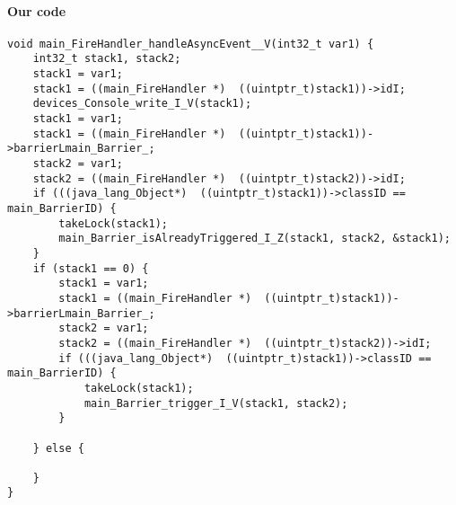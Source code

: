 \paragraph{Our code}\hfill
\begin{lstlisting}[firstnumber=2759]
void main_FireHandler_handleAsyncEvent__V(int32_t var1) {
	int32_t stack1, stack2;
	stack1 = var1;
	stack1 = ((main_FireHandler *)  ((uintptr_t)stack1))->idI;
	devices_Console_write_I_V(stack1);
	stack1 = var1;
	stack1 = ((main_FireHandler *)  ((uintptr_t)stack1))->barrierLmain_Barrier_;
	stack2 = var1;
	stack2 = ((main_FireHandler *)  ((uintptr_t)stack2))->idI;
	if (((java_lang_Object*)  ((uintptr_t)stack1))->classID == main_BarrierID) {
		takeLock(stack1);
		main_Barrier_isAlreadyTriggered_I_Z(stack1, stack2, &stack1);
	}
	if (stack1 == 0) {
		stack1 = var1;
		stack1 = ((main_FireHandler *)  ((uintptr_t)stack1))->barrierLmain_Barrier_;
		stack2 = var1;
		stack2 = ((main_FireHandler *)  ((uintptr_t)stack2))->idI;
		if (((java_lang_Object*)  ((uintptr_t)stack1))->classID == main_BarrierID) {
			takeLock(stack1);
			main_Barrier_trigger_I_V(stack1, stack2);
		}

	} else {
		
	}
}
\end{lstlisting}

